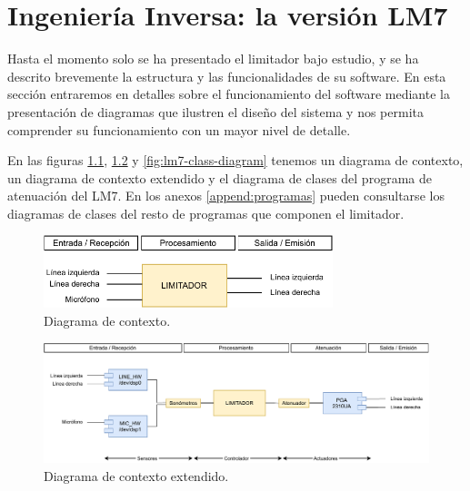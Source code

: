 \chapter{Ingeniería Inversa: la versión LM7} \label{cap:capitulo3_II}

Hasta el momento solo se ha presentado el limitador bajo estudio, y se ha descrito brevemente la estructura y las funcionalidades de su software. En esta sección entraremos en detalles sobre el funcionamiento del software mediante la presentación de diagramas que ilustren el diseño del sistema y nos permita comprender su funcionamiento con un mayor nivel de detalle.

En las figuras \ref{fig:lm7_overview}, \ref{fig:lm7_overview_extended} y \ref{fig:lm7-class-diagram} tenemos un diagrama de contexto, un diagrama de contexto extendido y el diagrama de clases del programa de atenuación del \acrshort{LM7}. En los anexos \ref{append:programas} pueden consultarse los diagramas de clases del resto de programas que componen el limitador.

\begin{figure}[h]
    \centering
    \includegraphics[width=0.75\textwidth]{figuras/lm7_overview.pdf}
    \caption{Diagrama de contexto.}
    \label{fig:lm7_overview}
\end{figure}

\begin{figure}[h]
    \centering
    \includegraphics[scale=0.75, angle=90]{figuras/lm7_overview_extended.pdf}
    \caption{Diagrama de contexto extendido.}
    \label{fig:lm7_overview_extended}
\end{figure}


